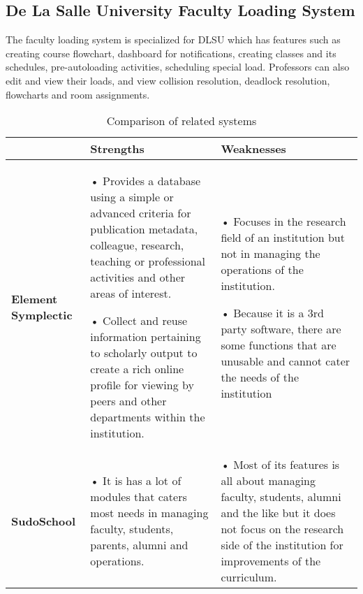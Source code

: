 \subsection{De La Salle University Faculty Loading System}
The faculty loading system is specialized for DLSU which has features such as creating course flowchart, dashboard for notifications, creating classes and its schedules, pre-autoloading activities, scheduling special load. Professors can also edit and view their loads, and view collision resolution, deadlock resolution, flowcharts and room assignments. 

\begin{table}
\centering
\caption{Comparison of related systems}
\begin{tabular}{p{1.5in} | p{2in} | p{2in}}
\hline
                                                              & \textbf{Strengths}                                                                                                                                                                                                                                                                                                                     & \textbf{Weaknesses}                                                                                                                                                                                                                          \\ \hline
\textbf{Element Symplectic} & • Provides a database using a simple or advanced criteria for publication metadata, colleague, research, teaching or professional activities and other areas of interest.

• Collect and reuse information pertaining to scholarly output to create a rich online profile for viewing by peers and other departments within the institution.~ & 
• Focuses in the research field of an institution but not in managing the operations of the institution. 

• Because it is a 3rd party software, there are some functions that are unusable and cannot cater the needs of the institution\\ \hline
\textbf{SudoSchool}                                                    & 
• It is has a lot of modules that caters most needs in managing faculty, students, parents, alumni and operations.                                                                                                                                                                                                                        & 
• Most of its features is all about managing faculty, students, alumni and the like but it does not focus on the research side of the institution for improvements of the curriculum.


\end{tabular}
\end{table}
